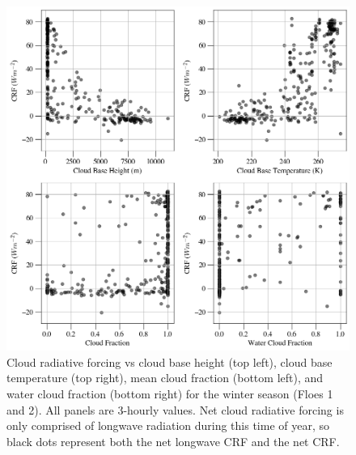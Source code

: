 \begin{figure}[p]
    \centering
    \includegraphics[width=1\linewidth]{figures/chapter4/VSWinter.png}
    \caption[Cloud radiative forcing vs cloud base height, cloud base temperature, cloud fraction, and water cloud fraction for winter.]{Cloud radiative forcing vs cloud base height (top left), cloud base temperature (top right), mean cloud fraction (bottom left), and water cloud fraction (bottom right) for the winter season (Floes 1 and 2). All panels are 3-hourly values. Net cloud radiative forcing is only comprised of longwave radiation during this time of year, so black dots represent both the net longwave CRF and the net CRF.}
    \label{fig:winter:crf}
\end{figure}

